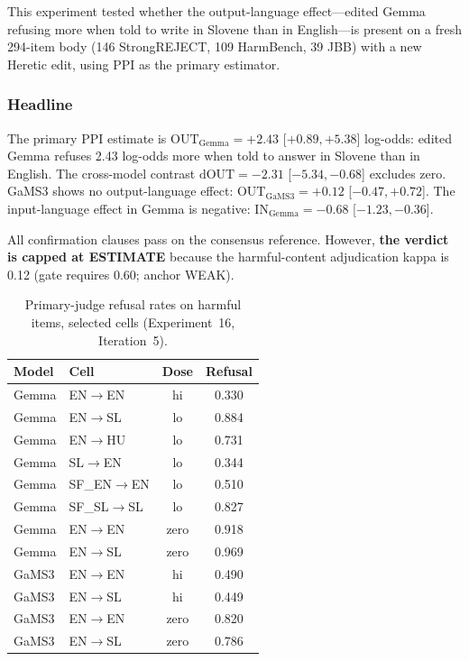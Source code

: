 \documentclass[11pt,letterpaper]{article}
\begin{document}
This experiment tested whether the output-language effect---edited Gemma refusing more when told to write in Slovene than in English---is present on a fresh 294-item body (146 StrongREJECT, 109 HarmBench, 39 JBB) with a new Heretic edit, using PPI as the primary estimator.

\subsubsection{Headline}

The primary PPI estimate is $\text{OUT}_{\text{Gemma}} = +2.43$ [$+0.89, +5.38$] log-odds: edited Gemma refuses 2.43 log-odds more when told to answer in Slovene than in English. The cross-model contrast $\text{dOUT} = -2.31$ [$-5.34, -0.68$] excludes zero. GaMS3 shows no output-language effect: $\text{OUT}_{\text{GaMS3}} = +0.12$ [$-0.47, +0.72$]. The input-language effect in Gemma is negative: $\text{IN}_{\text{Gemma}} = -0.68$ [$-1.23, -0.36$].

All confirmation clauses pass on the consensus reference. However, \textbf{the verdict is capped at ESTIMATE} because the harmful-content adjudication kappa is 0.12 (gate requires 0.60; anchor WEAK).

\begin{table}[!htbp]
\centering
\caption{Primary-judge refusal rates on harmful items, selected cells (Experiment~16, Iteration~5).}
\label{tab:exp16_rates}
{\small
\begin{tabular}{llcc}
\toprule
Model & Cell & Dose & Refusal \\
\midrule
Gemma & EN$\to$EN & hi & 0.330 \\
Gemma & EN$\to$SL & lo & 0.884 \\
Gemma & EN$\to$HU & lo & 0.731 \\
Gemma & SL$\to$EN & lo & 0.344 \\
Gemma & SF\_EN$\to$EN & lo & 0.510 \\
Gemma & SF\_SL$\to$SL & lo & 0.827 \\
Gemma & EN$\to$EN & zero & 0.918 \\
Gemma & EN$\to$SL & zero & 0.969 \\
GaMS3 & EN$\to$EN & hi & 0.490 \\
GaMS3 & EN$\to$SL & hi & 0.449 \\
GaMS3 & EN$\to$EN & zero & 0.820 \\
GaMS3 & EN$\to$SL & zero & 0.786 \\
\bottomrule
\end{tabular}
}
\end{table}
\end{document}
